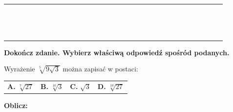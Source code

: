 \documentclass[12pt,a4paper]{article}
\theoremstyle{break}
\begin{document}
	\begin{tabular}{|p{0.1cm}|p{0.1cm}|p{0.1cm}|p{0.1cm}|p{0.1cm}|p{0.1cm}|p{0.1cm}|p{0.1cm}|p{0.1cm}|p{0.1cm}|p{0.1cm}|p{0.1cm}|p{0.1cm}|p{0.1cm}|p{0.1cm}|p{0.1cm}|p{0.1cm}|p{0.1cm}|p{0.1cm}|p{0.1cm}|p{0.1cm}|p{0.1cm}|p{0.1cm}|p{0.1cm}|p{0.1cm}|p{0.1cm}|p{0.1cm}|p{0.1cm}|p{0.1cm}|p{0.1cm}|p{0.1cm}|p{0.1cm}}
		\hline&&&&&&&&&&&&&&&&&&&&&&&&&&&&&&\\
		\hline&&&&&&&&&&&&&&&&&&&&&&&&&&&&&&\\
		\hline&&&&&&&&&&&&&&&&&&&&&&&&&&&&&&\\
		\hline&&&&&&&&&&&&&&&&&&&&&&&&&&&&&&\\
		\hline&&&&&&&&&&&&&&&&&&&&&&&&&&&&&&\\
		\hline&&&&&&&&&&&&&&&&&&&&&&&&&&&&&&\\
		\hline&&&&&&&&&&&&&&&&&&&&&&&&&&&&&&\\
		\hline&&&&&&&&&&&&&&&&&&&&&&&&&&&&&&\\
		\hline&&&&&&&&&&&&&&&&&&&&&&&&&&&&&&\\
		\hline&&&&&&&&&&&&&&&&&&&&&&&&&&&&&&\\
		\hline&&&&&&&&&&&&&&&&&&&&&&&&&&&&&&\\
		\hline&&&&&&&&&&&&&&&&&&&&&&&&&&&&&&\\
		\hline&&&&&&&&&&&&&&&&&&&&&&&&&&&&&&\\
		\hline&&&&&&&&&&&&&&&&&&&&&&&&&&&&&&\\
		\hline&&&&&&&&&&&&&&&&&&&&&&&&&&&&&&\\
		\hline
	\end{tabular}
	
	\newpage
	
	\begin{zad}[0-1]
		\textbf{Dokończ zdanie. Wybierz właściwą odpowiedź spośród podanych.}
	\end{zad} 
	
	Wyrażenie $\sqrt[5]{9\sqrt{3}}$ można zapisać w postaci:
	
	\vspace{0.5cm}
	\begin{tabular}{p{3.5cm} p{3.5cm} p{3.5cm} p{3.5cm}}
		\textbf{A. }$\sqrt[7]{27}$&
		\textbf{B. }$\sqrt[10]{3}$&
		\textbf{C. }$\sqrt{3}$&
		\textbf{D. }$\sqrt[10]{27}$\\
	\end{tabular}	
	
	
	\begin{zad}[0-2]
		\textbf{Oblicz:}
	\end{zad} 
	
\end{document}
